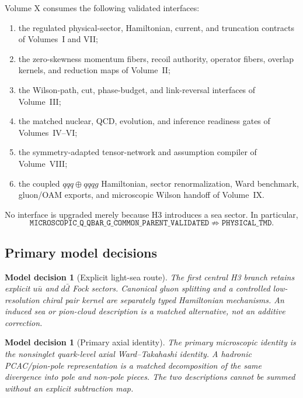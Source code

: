 \documentclass[11pt]{article}
\newtheorem{decision}[definition]{Model decision}
\begin{document}
Volume X consumes the following validated interfaces:
\begin{enumerate}
 \item the regulated physical-sector, Hamiltonian, current, and truncation
       contracts of Volumes~I and VII;
 \item the zero-skewness momentum fibers, recoil authority, operator fibers,
       overlap kernels, and reduction maps of Volume~II;
 \item the Wilson-path, cut, phase-budget, and link-reversal interfaces of
       Volume~III;
 \item the matched nuclear, QCD, evolution, and inference readiness gates of
       Volumes~IV--VI;
 \item the symmetry-adapted tensor-network and assumption compiler of
       Volume~VIII;
 \item the coupled \(qqq\oplus qqqg\) Hamiltonian, sector renormalization,
       Ward benchmark, gluon/OAM exports, and microscopic Wilson handoff of
       Volume~IX.
\end{enumerate}
No interface is upgraded merely because H3 introduces a sea sector.  In
particular,
\begin{equation}
 \texttt{MICROSCOPIC\_Q\_QBAR\_G\_COMMON\_PARENT\_VALIDATED}
 \not\Rightarrow
 \texttt{PHYSICAL\_TMD}.
\end{equation}

\subsection{Primary model decisions}

\begin{decision}[Explicit light-sea route]
The first central H3 branch retains explicit \(u\bar u\) and \(d\bar d\)
Fock sectors.  Canonical gluon splitting and a controlled low-resolution
chiral pair kernel are separately typed Hamiltonian mechanisms.  An induced
sea or pion-cloud description is a matched alternative, not an additive
correction.
\end{decision}

\begin{decision}[Primary axial identity]
The primary microscopic identity is the nonsinglet quark-level axial
Ward--Takahashi identity.  A hadronic PCAC/pion-pole representation is a
matched decomposition of the same divergence into pole and non-pole pieces.
The two descriptions cannot be summed without an explicit subtraction map.
\end{decision}
\end{document}
